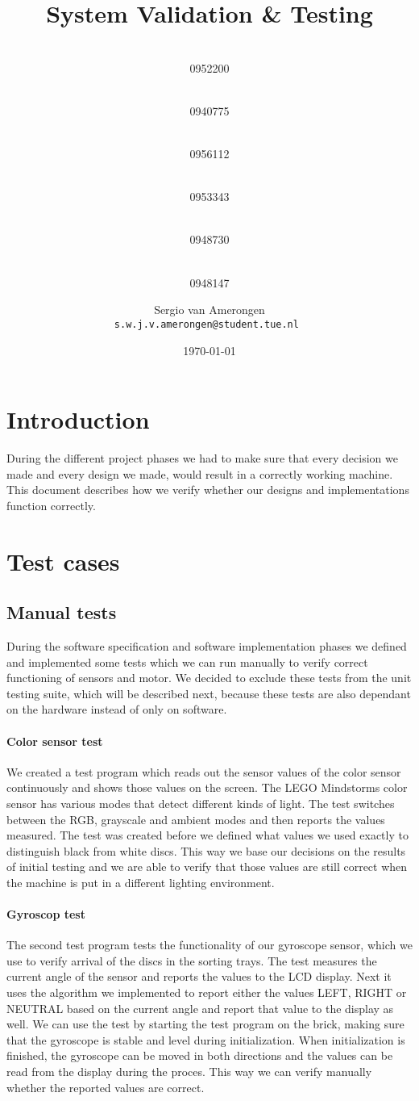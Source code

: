 \documentclass[a4paper,oneside,11pt]{article}
\title{\vspace{-\baselineskip}\sffamily\bfseries System Validation \& Testing}
\author{
	\makebox[.25\linewidth]{Sergio van Amerongen}\\0952200 \and
	\makebox[.25\linewidth]{Stefan Cloudt}\\0940775 \and
	\makebox[.25\linewidth]{Daan de Graaf}\\0956112 \and
	\makebox[.25\linewidth]{Robert van Lente}\\0953343 \and
	\makebox[.25\linewidth]{Tom Peters}\\0948730 \and
	\makebox[.25\linewidth]{Berrie Trippe}\\0948147 
	\and \makebox[.75\linewidth]{\textbf{Responsible:}} \and
	Sergio van Amerongen\\ \tt{s.w.j.v.amerongen@student.tue.nl}
}
\date{\today}
\begin{document}
\maketitle
\section{Introduction}
During the different project phases we had to make sure that every decision we made and every design we made, would result in a correctly working machine. This document describes how we verify whether our designs and implementations function correctly.

\section{Test cases}
\subsection{Manual tests}
During the software specification and software implementation phases we defined and implemented some tests which we can run manually to verify correct functioning of sensors and motor. We decided to exclude these tests from the unit testing suite, which will be described next, because these tests are also dependant on the hardware instead of only on software.

\paragraph{Color sensor test} We created a test program which reads out the sensor values of the color sensor continuously and shows those values on the screen. The LEGO Mindstorms color sensor has various modes that detect different kinds of light. The test switches between the RGB, grayscale and ambient modes and then reports the values measured. The test was created before we defined what values we used exactly to distinguish black from white discs. This way we base our decisions on the results of initial testing and we are able to verify that those values are still correct when the machine is put in a different lighting environment. 

\paragraph{Gyroscop test} The second test program tests the functionality of our gyroscope sensor, which we use to verify arrival of the discs in the sorting trays. The test measures the current angle of the sensor and reports the values to the LCD display. Next it uses the algorithm we implemented to report either the values LEFT, RIGHT or NEUTRAL based on the current angle and report that value to the display as well. We can use the test by starting the test program on the brick, making sure that the gyroscope is stable and level during initialization. When initialization is finished, the gyroscope can be moved in both directions and the values can be read from the display during the proces. This way we can verify manually whether the reported values are correct. 
\end{document}
